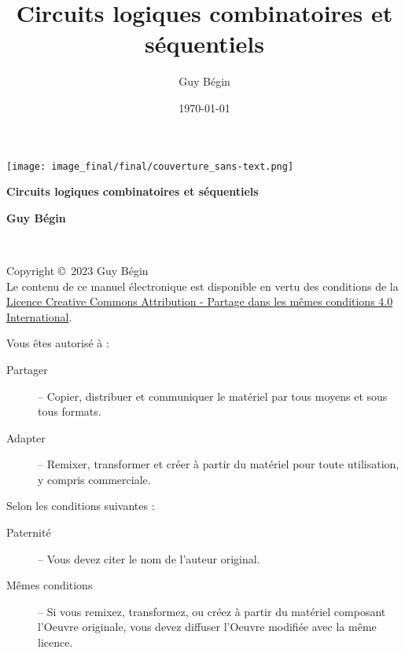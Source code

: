\documentclass[letter, oneside]{book}
\author{Guy Bégin}
\date{\today}
\title{Circuits logiques combinatoires et séquentiels}
\begin{document}

\titlepage 
	{\texttt{[image: image\_final/final/couverture\_sans-text.png]}} %
	{ %
		\centering\sffamily %
		{\Huge\bfseries Circuits logiques combinatoires et séquentiels\par} %
		\vspace{16pt} %
		\vspace{24pt} 
		{\huge\bfseries Guy Bégin\par} %
	}


\thispagestyle{empty} %

~\vfill %

\noindent Copyright \copyright\ 2023 Guy Bégin\\ %


\noindent 
Le contenu de ce manuel électronique est
disponible en vertu des conditions de la
\href{https://creativecommons.org/licenses/by-sa/4.0/deed.fr}{Licence
Creative Commons Attribution - Partage dans les mêmes conditions 4.0
International}.

Vous êtes autorisé à : 

\begin{description}
\item[{Partager}] – Copier, distribuer et communiquer le matériel par tous
moyens et sous tous formats.
\item[{Adapter}] – Remixer, transformer et créer à partir du matériel pour
toute utilisation, y compris commerciale.
\end{description}

Selon les conditions suivantes :

\begin{description}
\item[{Paternité}] – Vous devez citer le nom de l'auteur original.
\item[{Mêmes conditions}] – Si vous remixez, transformez, ou créez à
partir du matériel composant l'Oeuvre originale, vous devez diffuser
l'Oeuvre modifiée avec la même licence.
\end{description}
\end{document}
